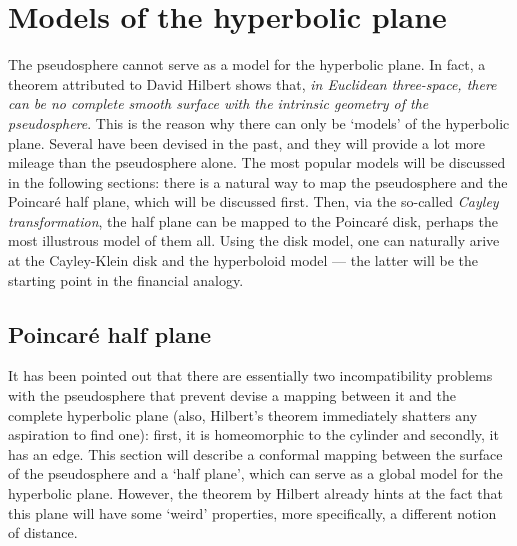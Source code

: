 
\section{Models of the hyperbolic plane}
The pseudosphere cannot serve as a model for the hyperbolic plane. In fact, a theorem attributed to David Hilbert shows that, \emph{in Euclidean three-space, there can be no complete smooth surface with the intrinsic geometry of the pseudosphere}. This is the reason why there can only be `models' of the hyperbolic plane. Several have been devised in the past, and they will provide a lot more mileage than the pseudosphere alone. The most popular models will be discussed in the following sections: there is a natural way to map the pseudosphere and the Poincaré half plane, which will be discussed first. Then, via the so-called \emph{Cayley transformation}, the half plane can be mapped to the Poincaré disk, perhaps the most illustrous model of them all. Using the disk model, one can naturally arive at the Cayley-Klein disk and the hyperboloid model --- the latter will be the starting point in the financial analogy.

\subsection{Poincaré half plane}
It has been pointed out that there are essentially two incompatibility problems with the pseudosphere that prevent devise a mapping between it and the complete hyperbolic plane (also, Hilbert's theorem immediately shatters any aspiration to find one): first, it is homeomorphic to the cylinder and secondly, it has an edge. This section will describe a conformal mapping between the surface of the pseudosphere and a `half plane', which can serve as a global model for the hyperbolic plane. However, the theorem by Hilbert already hints at the fact that this plane will have some `weird' properties, more specifically, a different notion of distance. 

